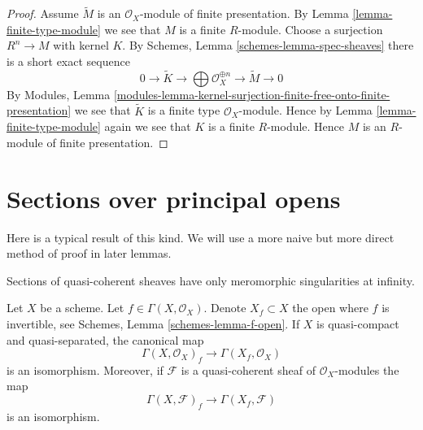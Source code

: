 \begin{proof}
Assume $\widetilde M$ is an $\mathcal{O}_X$-module of finite presentation.
By Lemma \ref{lemma-finite-type-module} we see that $M$ is a finite $R$-module.
Choose a surjection $R^n \to M$ with kernel $K$. By
Schemes, Lemma \ref{schemes-lemma-spec-sheaves}
there is a short exact sequence
$$
0 \to \widetilde{K} \to
\bigoplus \mathcal{O}_X^{\oplus n} \to
\widetilde{M} \to 0
$$
By
Modules, Lemma
\ref{modules-lemma-kernel-surjection-finite-free-onto-finite-presentation}
we see that $\widetilde{K}$ is a finite type $\mathcal{O}_X$-module.
Hence by Lemma \ref{lemma-finite-type-module}
again we see that $K$ is a finite $R$-module.
Hence $M$ is an $R$-module of finite presentation.
\end{proof}







\section{Sections over principal opens}
\label{section-principal-opens}

\noindent
Here is a typical result of this kind. We will use a more naive but
more direct method of proof in later lemmas.

\begin{lemma}
\label{lemma-invert-f-sections}
\begin{slogan}
Sections of quasi-coherent sheaves have only meromorphic singularities
at infinity.
\end{slogan}
Let $X$ be a scheme. Let $f \in \Gamma(X, \mathcal{O}_X)$.
Denote $X_f \subset X$ the open where $f$ is invertible, see
Schemes, Lemma \ref{schemes-lemma-f-open}.
If $X$ is quasi-compact and quasi-separated, the canonical map
$$
\Gamma(X, \mathcal{O}_X)_f \longrightarrow \Gamma(X_f, \mathcal{O}_X)
$$
is an isomorphism. Moreover, if $\mathcal{F}$ is a quasi-coherent
sheaf of $\mathcal{O}_X$-modules the map
$$
\Gamma(X, \mathcal{F})_f \longrightarrow \Gamma(X_f, \mathcal{F})
$$
is an isomorphism.
\end{lemma}

